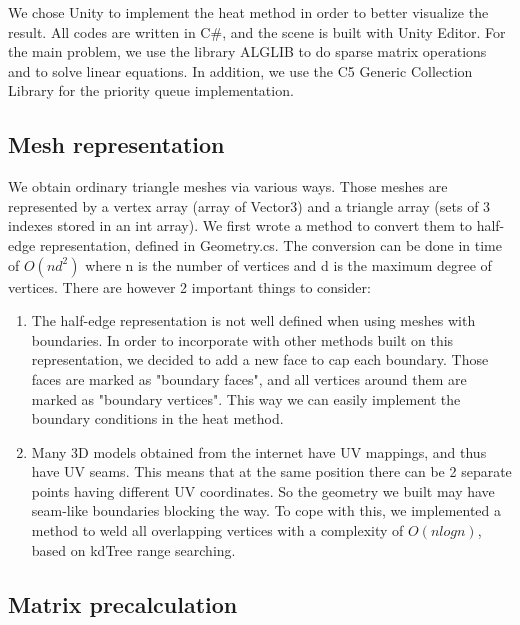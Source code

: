 \documentclass[a4paper,12pt,twoside]{article}
\begin{document}
We chose Unity to implement the heat method in order to better visualize the result. All codes are written in C\#, and the scene is built with Unity Editor. For the main problem, we use the library ALGLIB to do sparse matrix operations and to solve linear equations. In addition, we use the C5 Generic Collection Library for the priority queue implementation.


\subsection{Mesh representation}

We obtain ordinary triangle meshes via various ways. Those meshes are represented by a vertex array (array of Vector3) and a triangle array (sets of 3 indexes stored in an int array). We first wrote a method to convert them to half-edge representation, defined in Geometry.cs. The conversion can be done in time of $O(nd^2)$ where n is the number of vertices and d is the maximum degree of vertices. There are however 2 important things to consider:

\begin{enumerate}

\item
The half-edge representation is not well defined when using meshes with boundaries. In order to incorporate with other methods built on this representation, we decided to add a new face to cap each boundary. Those faces are marked as "boundary faces", and all vertices around them are marked as "boundary vertices". This way we can easily implement the boundary conditions in the heat method.

\item
Many 3D models obtained from the internet have UV mappings, and thus have UV seams. This means that at the same position there can be 2 separate points having different UV coordinates. So the geometry we built may have seam-like boundaries blocking the way. To cope with this, we implemented a method to weld all overlapping vertices with a complexity of $O(nlogn)$, based on kdTree range searching.

\end{enumerate}

\subsection{Matrix precalculation}
\end{document}
